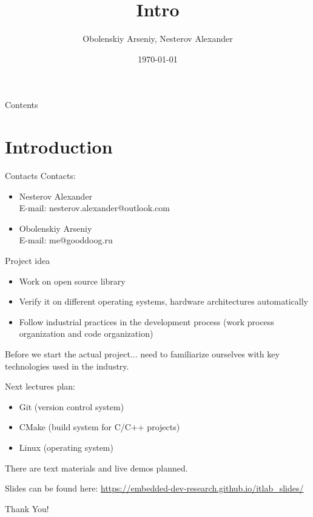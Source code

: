 \documentclass{beamer}
\title[Introduction]{Intro}
\author{Obolenskiy Arseniy, Nesterov Alexander}
\institute{ITLab}
\date{\today}
\begin{document}
\begin{frame}
    \titlepage
\end{frame}

\begin{frame}{Contents}
    \tableofcontents
\end{frame}

\section{Introduction}

\begin{frame}{Contacts}
  Contacts:
  \begin{itemize}
    \item Nesterov Alexander \\
      E-mail: nesterov.alexander@outlook.com
    \item Obolenskiy Arseniy \\
      E-mail: me@gooddoog.ru
  \end{itemize}
\end{frame}


\begin{frame}{Project idea}
  \begin{itemize}
    \item Work on open source library
    \item Verify it on different operating systems, hardware architectures automatically
    \item Follow industrial practices in the development process (work process organization and code organization)
  \end{itemize}
\end{frame}

\begin{frame}{Before we start the actual project...}
  need to familiarize ourselves with key technologies used in the industry.

  Next lectures plan:
  \begin{itemize}
    \item Git (version control system)
    \item CMake (build system for C/C++ projects)
    \item Linux (operating system)
  \end{itemize}

  There are text materials and live demos planned.

  Slides can be found here: \href{https://embedded-dev-research.github.io/itlab_slides/}{https://embedded-dev-research.github.io/itlab\_slides/}
\end{frame}

\begin{frame}
    \centering
    \Huge{Thank You!}
\end{frame}
\end{document}
